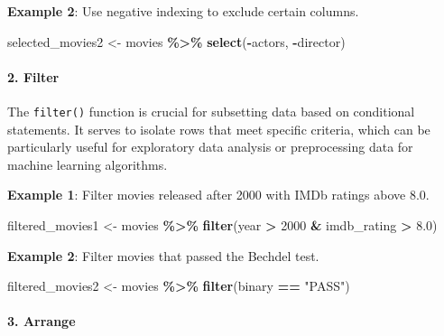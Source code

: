 \documentclass[
]{book}
\newenvironment{Shaded}{\begin{snugshade}}{\end{snugshade}}
\newcommand{\DecValTok}[1]{\textcolor[rgb]{0.00,0.00,0.81}{#1}}
\newcommand{\FloatTok}[1]{\textcolor[rgb]{0.00,0.00,0.81}{#1}}
\newcommand{\FunctionTok}[1]{\textcolor[rgb]{0.13,0.29,0.53}{\textbf{#1}}}
\newcommand{\NormalTok}[1]{#1}
\newcommand{\OtherTok}[1]{\textcolor[rgb]{0.56,0.35,0.01}{#1}}
\newcommand{\SpecialCharTok}[1]{\textcolor[rgb]{0.81,0.36,0.00}{\textbf{#1}}}
\newcommand{\StringTok}[1]{\textcolor[rgb]{0.31,0.60,0.02}{#1}}
\begin{document}
\textbf{Example 2}: Use negative indexing to exclude certain columns.

\begin{Shaded}
\begin{Highlighting}[]
\NormalTok{selected\_movies2 }\OtherTok{\textless{}{-}}\NormalTok{ movies }\SpecialCharTok{\%\textgreater{}\%}
  \FunctionTok{select}\NormalTok{(}\SpecialCharTok{{-}}\NormalTok{actors, }\SpecialCharTok{{-}}\NormalTok{director)}
\end{Highlighting}
\end{Shaded}

\hypertarget{filter}{%
\paragraph*{2. Filter}\label{filter}}

The \texttt{filter()} function is crucial for subsetting data based on conditional statements. It serves to isolate rows that meet specific criteria, which can be particularly useful for exploratory data analysis or preprocessing data for machine learning algorithms.

\textbf{Example 1}: Filter movies released after 2000 with IMDb ratings above 8.0.

\begin{Shaded}
\begin{Highlighting}[]
\NormalTok{filtered\_movies1 }\OtherTok{\textless{}{-}}\NormalTok{ movies }\SpecialCharTok{\%\textgreater{}\%}
  \FunctionTok{filter}\NormalTok{(year }\SpecialCharTok{\textgreater{}} \DecValTok{2000} \SpecialCharTok{\&}\NormalTok{ imdb\_rating }\SpecialCharTok{\textgreater{}} \FloatTok{8.0}\NormalTok{)}
\end{Highlighting}
\end{Shaded}

\textbf{Example 2}: Filter movies that passed the Bechdel test.

\begin{Shaded}
\begin{Highlighting}[]
\NormalTok{filtered\_movies2 }\OtherTok{\textless{}{-}}\NormalTok{ movies }\SpecialCharTok{\%\textgreater{}\%}
  \FunctionTok{filter}\NormalTok{(binary }\SpecialCharTok{==} \StringTok{"PASS"}\NormalTok{)}
\end{Highlighting}
\end{Shaded}

\hypertarget{arrange}{%
\paragraph*{3. Arrange}\label{arrange}}
\end{document}
